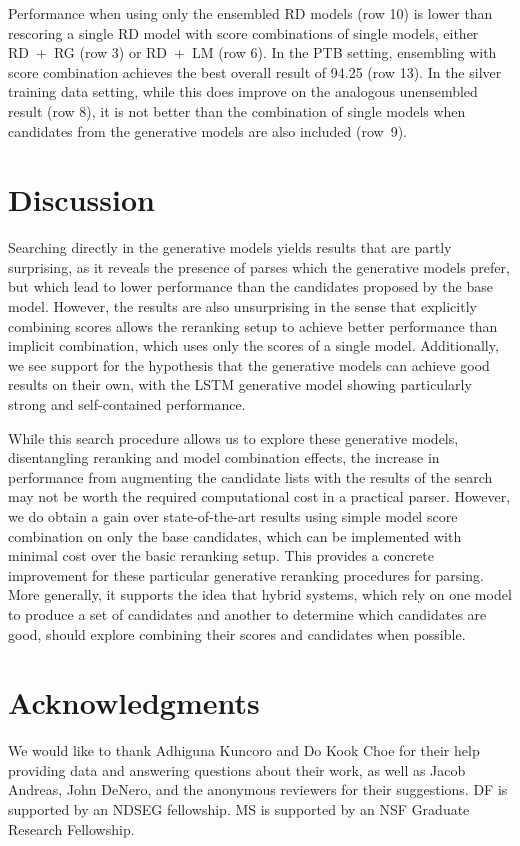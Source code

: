 \documentclass[11pt,a4paper]{article}
\begin{document}
Performance when using only the ensembled RD models (row 10) is lower than rescoring a single RD model with score combinations of single models, either \mbox{RD + RG} (row 3) or \mbox{RD + LM} (row 6). In the PTB setting, ensembling with score combination achieves the best overall result of 94.25 (row 13).  In the silver training data setting, while this does improve on the analogous unensembled result (row 8), it is not better than the combination of single models when candidates from the generative models are also included (row~9).

\section{Discussion}
Searching directly in the generative models yields results that are partly surprising, as it reveals the presence of parses which the generative models prefer, but which lead to lower performance than the candidates proposed by the base model. However, the results are also unsurprising in the sense that explicitly combining scores allows the reranking setup to achieve better performance than implicit combination, which uses only the scores of a single model. Additionally, we see support for the hypothesis that the generative models can achieve good results on their own, with the LSTM generative model showing particularly strong and self-contained performance.  

While this search procedure allows us to explore these generative models, disentangling reranking and model combination effects, the increase in performance from augmenting the candidate lists with the results of the search may not be worth the required computational cost in a practical parser. However, we do obtain a gain over state-of-the-art results using simple model score combination on only the base candidates, which can be implemented with minimal cost over the basic reranking setup. This provides a concrete improvement for these particular generative reranking procedures for parsing. More generally, it supports the idea that hybrid systems, which rely on one model to produce a set of candidates and another to determine which candidates are good, should explore combining their scores and candidates when possible.

\section*{Acknowledgments}

We would like to thank Adhiguna Kuncoro and Do Kook Choe for their help providing data and answering questions about their work, as well as Jacob Andreas, John DeNero, and the anonymous reviewers for their suggestions. DF is supported by an NDSEG fellowship. MS is supported by an NSF Graduate Research Fellowship.



\end{document}
